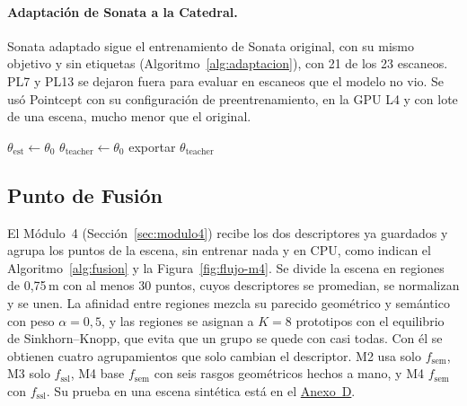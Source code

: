 \paragraph*{Adaptación de Sonata a la Catedral.} Sonata adaptado sigue el
entrenamiento de Sonata original, con su mismo objetivo y sin etiquetas
(Algoritmo~\ref{alg:adaptacion}), con 21 de los 23 escaneos. PL7 y PL13 se dejaron
fuera para evaluar en escaneos que el modelo no vio. Se usó Pointcept con su
configuración de preentrenamiento, en la GPU L4 y con lote de una escena, mucho menor
que el original.

\begin{algorithm}[!htbp]
\small
\caption{Adaptación de Sonata a la Catedral.}
\label{alg:adaptacion}
$\theta_{\mathrm{est}} \leftarrow \theta_0$ \quad $\theta_{\mathrm{teacher}} \leftarrow \theta_0$\;
exportar $\theta_{\mathrm{teacher}}$\;
\end{algorithm}

\subsection{Punto de Fusión}
\label{sec:fusion}

El Módulo~4 (Sección~\ref{sec:modulo4}) recibe los dos descriptores ya guardados y
agrupa los puntos de la escena, sin entrenar nada y en CPU, como indican el
Algoritmo~\ref{alg:fusion} y la Figura~\ref{fig:flujo-m4}. Se divide la escena en regiones de 0{,}75\,m con al
menos 30 puntos, cuyos descriptores se promedian, se normalizan y se unen. La
afinidad entre regiones mezcla su parecido geométrico y semántico con peso
$\alpha=0{,}5$, y las regiones se asignan a $K=8$ prototipos con el equilibrio de
Sinkhorn--Knopp, que evita que un grupo se quede con casi todas. Con él se
obtienen cuatro agrupamientos que solo cambian el descriptor. M2 usa
solo $f_{\mathrm{sem}}$, M3 solo $f_{\mathrm{ssl}}$, M4 base $f_{\mathrm{sem}}$ con
seis rasgos geométricos hechos a mano, y M4 $f_{\mathrm{sem}}$ con
$f_{\mathrm{ssl}}$. Su prueba en una escena sintética está en el
\hyperref[sec:m4-simulado]{Anexo~D}.

